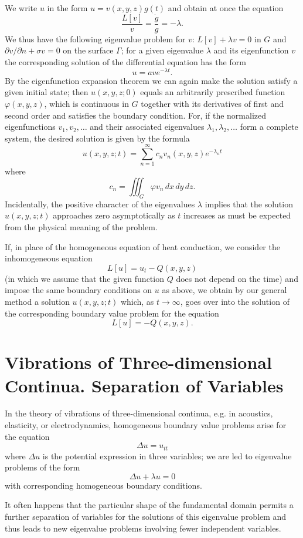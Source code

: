 We write $u$ in the form $u=v(x,y,z)g(t)$ and obtain at once the equation
\[
\frac{L[v]}{v}=\frac{\dot g}{g}=-\lambda.
\]
We thus have the following eigenvalue problem for $v$: $L[v]+\lambda v=0$ in $G$ and $\partial v/\partial n+\sigma v=0$ on the surface $\Gamma$; for a given eigenvalue $\lambda$ and its eigenfunction $v$ the corresponding solution of the differential equation has the form
\[
u=av e^{-\lambda t}.
\]
By the eigenfunction expansion theorem we can again make the solution satisfy a given initial state; then $u(x,y,z;0)$ equals an arbitrarily prescribed function $\varphi(x,y,z)$, which is continuous in $G$ together with its derivatives of first and second order and satisfies the boundary condition. For, if the normalized eigenfunctions $v_1,v_2,\ldots$ and their associated eigenvalues $\lambda_1,\lambda_2,\ldots$ form a complete system, the desired solution is given by the formula
\[
u(x,y,z;t)=\sum_{n=1}^{\infty}c_nv_n(x,y,z)e^{-\lambda_nt}
\]
where
\[
c_n=\iiint_G\varphi v_n\,dx\,dy\,dz.
\]
Incidentally, the positive character of the eigenvalues $\lambda$ implies that the solution $u(x,y,z;t)$ approaches zero asymptotically as $t$ increases as must be expected from the physical meaning of the problem.

If, in place of the homogeneous equation of heat conduction, we consider the inhomogeneous equation
\[
L[u]=u_t-Q(x,y,z)
\]
(in which we assume that the given function $Q$ does not depend on the time) and impose the same boundary conditions on $u$ as above, we obtain by our general method a solution $u(x,y,z;t)$ which, as $t\to\infty$, goes over into the solution of the corresponding boundary value problem for the equation
\[
L[u]=-Q(x,y,z).
\]

\section{Vibrations of Three-dimensional Continua. Separation of Variables}
In the theory of vibrations of three-dimensional continua, e.g. in acoustics, elasticity, or electrodynamics, homogeneous boundary value problems arise for the equation
\[
\Delta u=u_{tt}
\]
where $\Delta u$ is the potential expression in three variables; we are led to eigenvalue problems of the form
\[
\Delta u+\lambda u=0
\]
with corresponding homogeneous boundary conditions.

It often happens that the particular shape of the fundamental domain permits a further separation of variables for the solutions of this eigenvalue problem and thus leads to new eigenvalue problems involving fewer independent variables.

